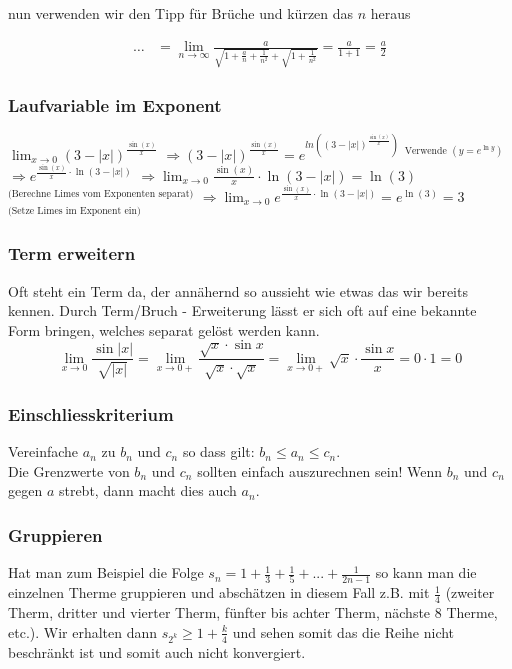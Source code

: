nun verwenden wir den Tipp für Brüche und kürzen das $n$ heraus

\begin{align*}
\ldots &= \lim_{n \to \infty} \frac{a}{\sqrt{1 + \frac{a}{n} + \frac{1}{n^2}} +
\sqrt{1 + \frac{1}{n^2}}} = \frac{a}{1 + 1} = \frac{a}{2}
\end{align*}

\subsubsection{Laufvariable im Exponent}
$\lim_{x \to 0} (3 - |x|)^{\frac{\sin(x)}{x}}$\newline
$\Rightarrow (3 - |x|)^{\frac{\sin(x)}{x}} = e^{ln((3 - |x|)^{\frac{\sin(x)}{x}})}$\newline
$^{\text{Verwende } (y = e^{\ln y})}$\newline
$\Rightarrow e^{\frac{\sin(x)}{x} \cdot \ln(3 - |x|)}$\newline
$\Rightarrow \lim_{x \to 0}\frac{\sin(x)}{x}\cdot \ln(3-|x|) = \ln(3)$\newline
$^{\text{(Berechne Limes vom Exponenten separat)}}$\newline
$\Rightarrow \lim_{x \to 0}e^{\frac{\sin(x)}{x} \cdot \ln(3 - |x|)} = e^{\ln(3)} = 3$\newline
$^{\text{(Setze Limes im Exponent ein)}}$

\subsubsection{Term erweitern}
Oft steht ein Term da, der annähernd so aussieht wie etwas das wir bereits kennen. Durch Term/Bruch - Erweiterung lässt er sich oft auf eine bekannte Form bringen, welches separat gelöst werden kann.
\[
	\lim_{x \to 0} \frac{\sin |x|}{\sqrt{|x|}} = 
	\lim_{x \to 0+} \frac{\sqrt{x} \cdot \sin x}{\sqrt{x} \cdot \sqrt{x}} =
	\lim_{x \to 0+} \sqrt{x} \cdot \frac{\sin x}{x} = 0 \cdot 1 = 0
\]

\subsubsection{Einschliesskriterium}
Vereinfache $a_n$ zu $b_n$ und $c_n$ so dass gilt: $b_n \leq a_n \leq c_n$. \\
Die Grenzwerte von $b_n$ und $c_n$ sollten einfach auszurechnen sein! 
Wenn $b_n$ und $c_n$ gegen $a$ strebt, dann macht dies auch $a_n$.

\subsubsection{Gruppieren}
Hat man zum Beispiel die Folge $s_n = 1 + \frac{1}{3} + \frac{1}{5} + ... + \frac{1}{2n-1}$ so kann man die 
einzelnen Therme gruppieren und abschätzen in diesem Fall z.B. mit $\frac{1}{4}$ (zweiter Therm, dritter und vierter Therm,
fünfter bis achter Therm, nächste 8 Therme, etc.). Wir erhalten dann $s_{2^k} \geq 1 + \frac{k}{4}$ und sehen somit das die 
Reihe nicht beschränkt ist und somit auch nicht konvergiert.